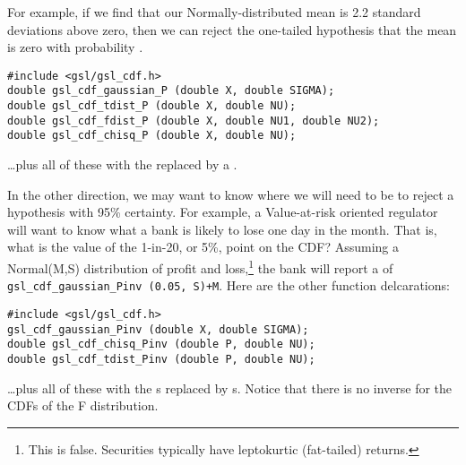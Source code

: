 For example, if we find that our Normally-distributed mean is 2.2 standard
deviations above zero, then we can reject the one-tailed hypothesis that
the mean is zero with probability .

\begin{lstlisting}
#include <gsl/gsl_cdf.h>
double gsl_cdf_gaussian_P (double X, double SIGMA);
double gsl_cdf_tdist_P (double X, double NU);
double gsl_cdf_fdist_P (double X, double NU1, double NU2);
double gsl_cdf_chisq_P (double X, double NU);
\end{lstlisting}
\dots plus all of these with the  replaced by a .


In the other direction, we may want to know where we will need to be to reject a hypothesis with 95\%
certainty. For example, a Value-at-risk oriented regulator will want to know what a bank is likely to lose 
one day in the month. That is, what is the value of the 1-in-20, or 5\%, point on the CDF?
Assuming a Normal(M,S) distribution of profit and loss,\footnote{This is false. Securities
typically have leptokurtic (fat-tailed) returns.} the bank will report a  of {\tt
gsl\_cdf\_gaussian\_Pinv (0.05, S)+M}. Here are the other function delcarations:
\begin{lstlisting}
#include <gsl/gsl_cdf.h>
gsl_cdf_gaussian_Pinv (double X, double SIGMA);
double gsl_cdf_chisq_Pinv (double P, double NU);
double gsl_cdf_tdist_Pinv (double P, double NU);
\end{lstlisting}
\dots plus all of these with the s replaced by s.
Notice that there is no inverse for the CDFs of the F distribution.





